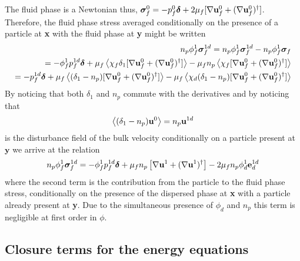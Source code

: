 The fluid phase is a Newtonian thus, $\bm\sigma_f^0 = - p_f^0\bm\delta + 2\mu_f [\mathbf{\nabla} \textbf{u}_f^0 + (\mathbf{\nabla} \textbf{u}_f^0)^\dagger]$.
Therefore, the fluid phase stress averaged conditionally on the presence of a particle at \textbf{x} with the fluid phase at \textbf{y} might be written
\begin{align*}
    n_p \phi_f^1 \bm\sigma_f^{1d} = 
    n_p \phi_f^1 \bm\sigma_f^{1d} 
    - n_p \phi_f^1 \bm\sigma_f \\
    = - \phi_f^1 p_f^{1d}\bm\delta 
    + \mu_f \left<\chi_f \delta_1 [\mathbf{\nabla} \textbf{u}_f^0 + (\mathbf{\nabla} \textbf{u}_f^0)^\dagger] \right>
    - \mu_f n_p \left<\chi_f [\mathbf{\nabla} \textbf{u}_f^0 + (\mathbf{\nabla} \textbf{u}_f^0)^\dagger] \right>\\
    =- p_f^{1d}\bm\delta 
    + \mu_f \left<(\delta_1 - n_p) [\mathbf{\nabla} \textbf{u}_f^0 + (\mathbf{\nabla} \textbf{u}_f^0)^\dagger] \right>
    - \mu_f \left<\chi_d (\delta_1 - n_p) [\mathbf{\nabla} \textbf{u}_f^0 + (\mathbf{\nabla} \textbf{u}_f^0)^\dagger] \right>
\end{align*}
By noticing that both $\delta_1$ and $n_p$ commute with the derivatives and by noticing that  
\begin{equation*}
    \left<(\delta_1 - n_p)  \textbf{u}^0\right>
    = 
    n_p \textbf{u}^{1d}
\end{equation*}
is the disturbance field of the bulk velocity conditionally on a particle present at $\textbf{y}$ we arrive at the relation 
\begin{align*}
    n_p \phi_f^1 \bm\sigma_f^{1d} = 
    - \phi_f^1 p_f^{1d} \bm\delta 
    + \mu_f n_p \left[\mathbf{\nabla} \textbf{u}^1 + (\mathbf{\nabla} \textbf{u}^1)^\dagger\right]
    - 2 \mu_f n_p \phi_d^1 \textbf{e}_d^{1d}
\end{align*}
where the second term is the contribution from the particle to the fluid phase stress, conditionally on the presence of the dispersed phase at \textbf{x} with a particle already present at \textbf{y}. 
Due to the simultaneous presence of $\phi_d$ and $n_p$ this term is negligible at first order in $\phi$. 

\subsection{Closure terms for the energy equations}
